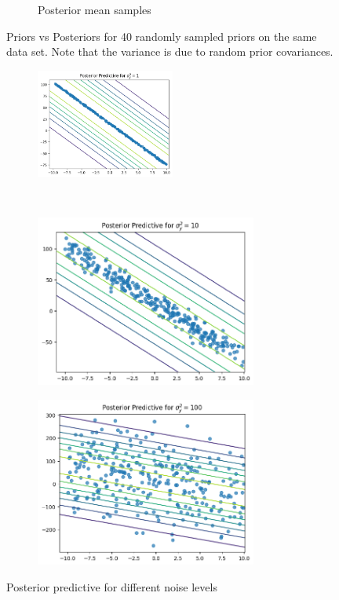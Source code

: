 \begin{figure}[H]
\begin{subfigure}{.5\textwidth}
  \caption{Posterior mean samples}
\end{subfigure}
\caption{Priors vs Posteriors for 40 randomly sampled priors on the same data set. Note that the variance is due to random prior covariances.}
\label{fig:random-prior}
\end{figure}

\begin{figure}[H]
\begin{subfigure}{1\textwidth}
  \centering
  \includegraphics[width=0.5\textwidth]{assets/week1/noise-1.png}
\end{subfigure}\\
\begin{subfigure}{.5\textwidth}
  \centering
  \includegraphics[width=0.8\textwidth]{assets/week1/noise-10.png}
\end{subfigure}%
\begin{subfigure}{.5\textwidth}
  \centering
  \includegraphics[width=0.8\textwidth]{assets/week1/noise-100.png}
\end{subfigure}
\caption{Posterior predictive for different noise levels}
\label{fig:posterior-predictive}
\end{figure}
